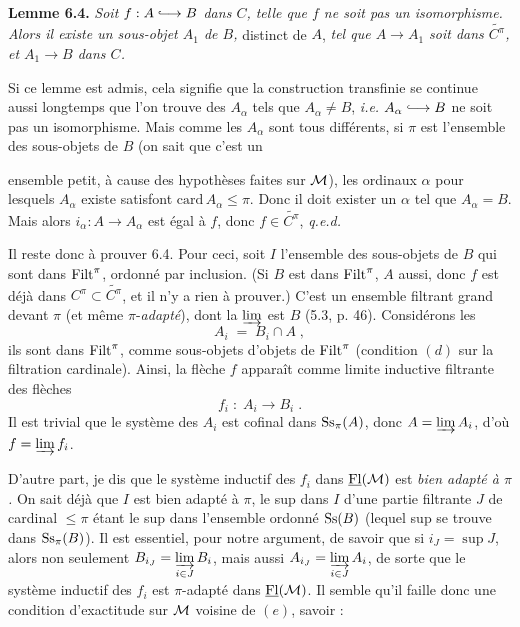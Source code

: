 \textbf{Lemme 6.4.} \textit{Soit $f : A \into B$ dans $C$, telle que $f$ ne soit pas un isomorphisme. Alors il existe un sous-objet $A_{1}$ de $B$,} distinct de $A$, \textit{tel que $A \longrightarrow A_{1}$ soit dans $\widetilde{C^{\pi}}$, et $A_{1} \longrightarrow B$ dans $C$.}

Si ce lemme est admis, cela signifie que la construction transfinie se continue aussi longtemps que l'on trouve des $A_{\alpha}$ tels que $A_{\alpha} \neq B$, \textit{i.e.} $A_{\alpha} \into B$ ne soit pas un isomorphisme. Mais comme les $A_{\alpha}$ sont tous différents, si $\pi$ est l'ensemble des sous-objets de $B$ (on sait que c'est un


ensemble petit, à cause des hypothèses faites sur $\mathcal{M}$), les ordinaux $\alpha$ pour lesquels $A_\alpha$ existe satisfont $\mathrm{card}\,A_\alpha \leq \pi$. Donc il doit exister un $\alpha$ tel que $A_\alpha = B$. Mais alors $i_\alpha : A \longrightarrow A_\alpha$ est égal à $f$, donc $f \in \widetilde{C^{\pi}}$, \quad \textit{q.e.d.}

Il reste donc à prouver 6.4. Pour ceci, soit $I$ l'ensemble des sous-objets de $B$ qui sont dans $\mathrm{Filt}^{\pi}$, ordonné par inclusion. (Si $B$ est dans $\mathrm{Filt}^{\pi}$, $A$ aussi, donc $f$ est déjà dans $C^{\pi} \subset \widetilde{C^{\pi}}$, et il n'y a rien à prouver.) C'est un ensemble filtrant grand devant $\pi$ (et même $\pi$-\textit{adapté}), dont la $\varinjlim$ est $B$ (5.3, p. 46). Considérons les
\[
A_i \;=\; B_i \cap A \;,
\]
ils sont dans $\mathrm{Filt}^{\pi}$, comme sous-objets d'objets de $\mathrm{Filt}^{\pi}$ (condition $(d)$ sur la filtration cardinale). Ainsi, la flèche $f$ apparaît comme limite inductive filtrante des flèches
\[
f_i \;:\; A_i \longrightarrow B_i \;.
\]
Il est trivial que le système des $A_i$ est cofinal dans $\mathrm{Ss}_{\pi}(A)$, donc $A = \varinjlim A_i$, d'où $f = \varinjlim f_i$.

D'autre part, je dis que le système inductif des $f_i$ dans $\underline{\mathrm{Fl}}(\mathcal{M})$ est \textit{bien adapté à $\pi$.} On sait déjà que $I$ est bien adapté à $\pi$, le sup dans $I$ d'une partie filtrante $J$ de cardinal $\leq \pi$ étant le sup dans l'ensemble ordonné $\mathrm{Ss}(B)$ (lequel sup se trouve dans $\mathrm{Ss}_{\pi}(B)$). Il est essentiel, pour notre argument, de savoir que si $i_J = \sup J$, alors non seulement $B_{i_J} = \varinjlim\limits_{i\in J} B_i$, mais \marginpar{$\|$}%
aussi $A_{i_J} = \varinjlim\limits_{i\in J} A_i$, de sorte que le système inductif des $f_i$ est $\pi$-adapté dans $\underline{\mathrm{Fl}}(\mathcal{M})$. Il semble qu'il faille donc une condition d'exactitude sur $\mathcal{M}$ voisine de $(e)$, savoir :

